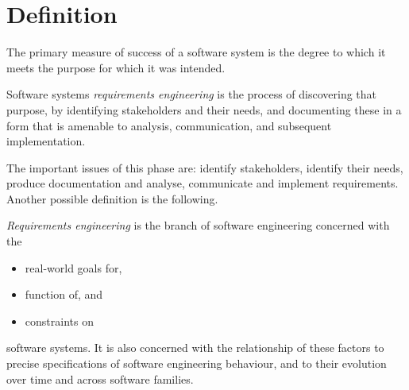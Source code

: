 \documentclass[12pt, a4paper]{report}
\newtheorem[style=M,bodystyle=\normalfont]{theorem}{Theorem}
\newtheorem[style=M,bodystyle=\normalfont]{corollary}{Corollary}
\newtheorem[style=M,bodystyle=\normalfont]{lemma}{Lemma}
\newtheorem[style=M,bodystyle=\normalfont]{definition}{Definition}
\begin{document}
\section{Definition}
    The primary measure of success of a software system is the degree to which it meets the purpose for which it was intended.
    \begin{definition}
        Software systems \emph{requirements engineering} is the process of discovering that purpose, by identifying stakeholders and their needs, and documenting these in a form that is amenable to analysis, communication, and subsequent implementation. 
    \end{definition}
    The important issues of this phase are: identify stakeholders, identify their needs, produce documentation and analyse, communicate and implement requirements. Another possible definition is the following. 
    \begin{definition}
        \emph{Requirements engineering} is the branch of software engineering concerned with the 
        \begin{itemize}
            \item real-world goals for,
            \item function of, and
            \item constraints on
        \end{itemize}
        software systems. It is also concerned with the relationship of these factors to precise specifications of software engineering behaviour, and to their evolution over time and across software families. 
    \end{definition}
\end{document}
